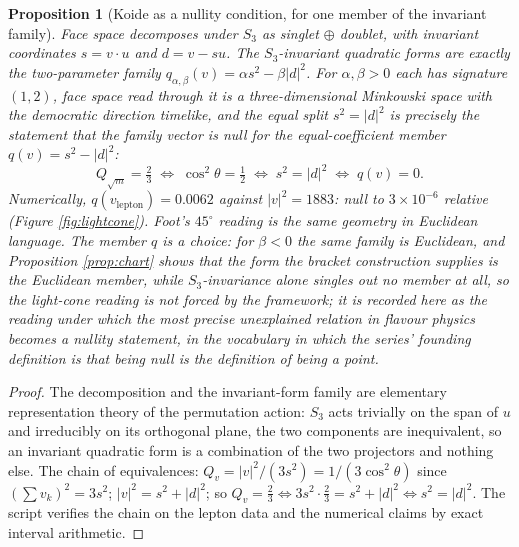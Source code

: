 \documentclass[11pt]{article}
\newtheorem{proposition}[theorem]{Proposition}
\theoremstyle{definition}
\begin{document}
\begin{proposition}[Koide as a nullity condition, for one member of the invariant family]\label{prop:nullity}
Face space decomposes under $S_{3}$ as singlet $\oplus$ doublet, with invariant coordinates $s = v \cdot u$ and $d = v - su$. The $S_{3}$-invariant quadratic forms are exactly the two-parameter family $q_{\alpha,\beta}(v) = \alpha s^{2} - \beta|d|^{2}$. For $\alpha, \beta > 0$ each has signature $(1, 2)$, face space read through it is a three-dimensional Minkowski space with the democratic direction timelike, and the equal split $s^{2} = |d|^{2}$ is precisely the statement that the family vector is \emph{null} for the equal-coefficient member $q(v) = s^{2} - |d|^{2}$:
\[
Q_{\sqrt{m}} = \tfrac23 \;\iff\; \cos^{2}\theta = \tfrac12 \;\iff\; s^{2} = |d|^{2} \;\iff\; q(v) = 0 .
\]
Numerically, $q(v_{\mathrm{lepton}}) = 0.0062$ against $|v|^{2} = 1883$: null to $3 \times 10^{-6}$ relative (Figure \ref{fig:lightcone}). Foot's $45^{\circ}$ reading \cite{Foot1994} is the same geometry in Euclidean language. The member $q$ is a choice: for $\beta < 0$ the same family is Euclidean, and Proposition \ref{prop:chart} shows that the form the bracket construction supplies is the Euclidean member, while $S_{3}$-invariance alone singles out no member at all, so the light-cone reading is not forced by the framework; it is recorded here as the reading under which the most precise unexplained relation in flavour physics becomes a nullity statement, in the vocabulary in which the series' founding definition is that being null is the definition of being a point.
\end{proposition}

\begin{proof}
The decomposition and the invariant-form family are elementary representation theory of the permutation action: $S_{3}$ acts trivially on the span of $u$ and irreducibly on its orthogonal plane, the two components are inequivalent, so an invariant quadratic form is a combination of the two projectors and nothing else. The chain of equivalences: $Q_{v} = |v|^{2}/(3s^{2}) = 1/(3\cos^{2}\theta)$ since $(\sum v_{k})^{2} = 3s^{2}$; $|v|^{2} = s^{2} + |d|^{2}$; so $Q_{v} = \tfrac23 \iff 3s^{2} \cdot \tfrac23 = s^{2} + |d|^{2} \iff s^{2} = |d|^{2}$. The script verifies the chain on the lepton data and the numerical claims by exact interval arithmetic.
\end{proof}
\end{document}
